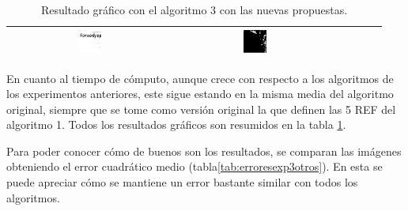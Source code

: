 \begin{table}
\begin{tabular}{cccccc}
\includegraphics[width=0.15\textwidth]{img/res/e3a/alg3ctipo-09.jpg} &
\includegraphics[width=0.15\textwidth]{img/res/e3a/alg3ctipo-07.jpg}\\\hline
\end{tabular}
\caption{Resultado gráfico con el algoritmo 3 con las nuevas propuestas.\label{tab:resultexp3imagenesdombi}}
\end{table}

En cuanto al tiempo de cómputo, aunque crece con respecto a los algoritmos de los experimentos anteriores, este sigue estando en la misma media del algoritmo original, siempre que se tome como versión original la que definen las 5 REF del algoritmo 1. Todos los resultados gráficos son resumidos en la tabla \ref{tab:resultexp3imagenesdombi}.


Para poder conocer cómo de buenos son los resultados, se comparan las imágenes obteniendo el error cuadrático medio (tabla\ref{tab:erroresexp3otros}). En esta se puede apreciar cómo se mantiene un error bastante similar con todos los algoritmos.



